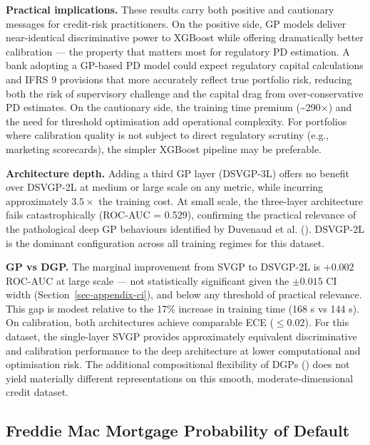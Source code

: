 \documentclass[
  letterpaper,
  DIV=11,
  numbers=noendperiod]{scrartcl}
\begin{document}
\textbf{Practical implications.} These results carry both positive and
cautionary messages for credit-risk practitioners. On the positive side,
GP models deliver near-identical discriminative power to XGBoost while
offering dramatically better calibration --- the property that matters
most for regulatory PD estimation. A bank adopting a GP-based PD model
could expect regulatory capital calculations and IFRS 9 provisions that
more accurately reflect true portfolio risk, reducing both the risk of
supervisory challenge and the capital drag from over-conservative PD
estimates. On the cautionary side, the training time premium
(\textasciitilde290\(\times\)) and the need for threshold optimisation
add operational complexity. For portfolios where calibration quality is
not subject to direct regulatory scrutiny (e.g., marketing scorecards),
the simpler XGBoost pipeline may be preferable.

\textbf{Architecture depth.} Adding a third GP layer (DSVGP-3L) offers
no benefit over DSVGP-2L at medium or large scale on any metric, while
incurring approximately \(3.5\times\) the training cost. At small scale,
the three-layer architecture fails catastrophically (ROC-AUC = 0.529),
confirming the practical relevance of the pathological deep GP
behaviours identified by Duvenaud et al.
(). DSVGP-2L is the dominant
configuration across all training regimes for this dataset.

\textbf{GP vs DGP.} The marginal improvement from SVGP to DSVGP-2L is
+0.002 ROC-AUC at large scale --- not statistically significant given
the \(\pm 0.015\) CI width (Section~\ref{sec-appendix-ci}), and below
any threshold of practical relevance. This gap is modest relative to the
17\% increase in training time (168 s vs 144 s). On calibration, both
architectures achieve comparable ECE (\(\leq 0.02\)). For this dataset,
the single-layer SVGP provides approximately equivalent discriminative
and calibration performance to the deep architecture at lower
computational and optimisation risk. The additional compositional
flexibility of DGPs () does not yield materially different representations on
this smooth, moderate-dimensional credit dataset.

\subsection{Freddie Mac Mortgage Probability of
Default}\label{sec-freddie-mac}
\end{document}
